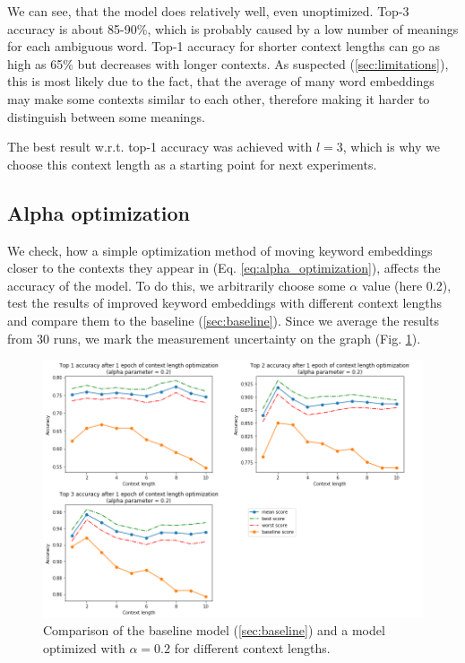 \documentclass{llncs}
\begin{document}
We can see, that the model does relatively well, even unoptimized.
Top-3 accuracy is about 85-90\%, which is probably caused by a low number of meanings for each ambiguous word.
Top-1 accuracy for shorter context lengths can go as high as 65\% but decreases with longer contexts.
As suspected (\ref{sec:limitations}), this is most likely due to the fact, that the average of many word embeddings may make some contexts similar to each other, therefore making it harder to distinguish between some meanings.

The best result w.r.t. top-1 accuracy was achieved with \(l=3\), which is why we choose this context length as a starting point for next experiments.

\subsection{Alpha optimization}
\label{sec:exp_alpha}
We check, how a simple optimization method of moving keyword embeddings closer to the contexts they appear in (Eq. \ref{eq:alpha_optimization}), affects the accuracy of the model.
To do this, we arbitrarily choose some \(\alpha\) value (here 0.2), test the results of improved keyword embeddings with different context lengths and compare them to the baseline (\ref{sec:baseline}). Since we average the results from 30 runs, we mark the measurement uncertainty on the graph (Fig. \ref{fig:exp1_optimization}).

\begin{figure}
    \centering
    \caption{Comparison of the baseline model (\ref{sec:baseline}) and a model optimized with \(\alpha=0.2\) for different context lengths.}
    \label{fig:exp1_optimization}
    \includegraphics[scale=0.7]{res/exp1_context_top_acc.png}
\end{figure}
\end{document}
